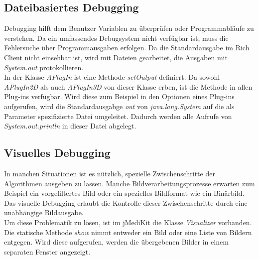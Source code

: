 \subsection{Dateibasiertes Debugging}
Debugging hilft dem Benutzer Variablen zu überprüfen oder Programmabläufe zu verstehen. Da ein umfassendes Debugsystem nicht verfügbar ist, muss die Fehlersuche über Programmausgaben erfolgen. Da die Standardausgabe im Rich Client nicht einsehbar ist, wird mit Dateien gearbeitet, die Ausgaben mit \textit{System.out} protokollieren.\\
In der Klasse \textit{APlugIn} ist eine Methode \textit{setOutput} definiert. Da sowohl \textit{APlugIn2D} als auch \textit{APlugIn3D} von dieser Klasse erben, ist die Methode in allen Plug-ins verfügbar. Wird diese zum Beispiel in den Optionen eines Plug-ins aufgerufen, wird die Standardausgabge \textit{out} von \textit{java.lang.System} auf die als Parameter spezifizierte Datei umgeleitet. Dadurch werden alle Aufrufe von \textit{System.out.println} in dieser Datei abgelegt.

\subsection{Visuelles Debugging}
In manchen Situationen ist es nützlich, spezielle Zwischenschritte der Algorithmen ausgeben zu lassen. Manche Bildverarbeitungsprozesse erwarten zum Beispiel ein vorgefiltertes Bild oder ein spezielles Bildformat wie ein Binärbild. Das visuelle Debugging erlaubt die Kontrolle dieser Zwischenschritte durch eine unabhängige Bildausgabe.\\
Um diese Problematik zu lösen, ist im jMediKit die Klasse \textit{Visualizer} vorhanden. Die statische Methode \textit{show} nimmt entweder ein Bild oder eine Liste von Bildern entgegen. Wird diese aufgerufen, werden die übergebenen Bilder in einem separaten Fenster angezeigt.

